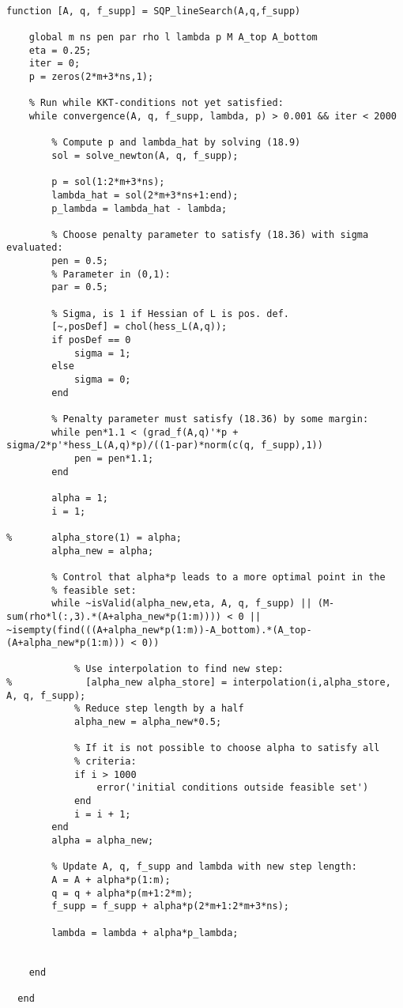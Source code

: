 \begin{lstlisting}

function [A, q, f_supp] = SQP_lineSearch(A,q,f_supp)
  
    global m ns pen par rho l lambda p M A_top A_bottom
    eta = 0.25;
    iter = 0;
    p = zeros(2*m+3*ns,1);

    % Run while KKT-conditions not yet satisfied:
    while convergence(A, q, f_supp, lambda, p) > 0.001 && iter < 2000 
        
        % Compute p and lambda_hat by solving (18.9)
        sol = solve_newton(A, q, f_supp);
        
        p = sol(1:2*m+3*ns);
        lambda_hat = sol(2*m+3*ns+1:end);
        p_lambda = lambda_hat - lambda;
        
        % Choose penalty parameter to satisfy (18.36) with sigma evaluated:
        pen = 0.5;
        % Parameter in (0,1):
        par = 0.5;

        % Sigma, is 1 if Hessian of L is pos. def.
        [~,posDef] = chol(hess_L(A,q));
        if posDef == 0
            sigma = 1;
        else
            sigma = 0;
        end

        % Penalty parameter must satisfy (18.36) by some margin:
        while pen*1.1 < (grad_f(A,q)'*p + sigma/2*p'*hess_L(A,q)*p)/((1-par)*norm(c(q, f_supp),1))
            pen = pen*1.1;
        end

        alpha = 1;
        i = 1;
            
%       alpha_store(1) = alpha;
        alpha_new = alpha;
        
        % Control that alpha*p leads to a more optimal point in the
        % feasible set:
        while ~isValid(alpha_new,eta, A, q, f_supp) || (M-sum(rho*l(:,3).*(A+alpha_new*p(1:m)))) < 0 || ~isempty(find(((A+alpha_new*p(1:m))-A_bottom).*(A_top-(A+alpha_new*p(1:m))) < 0))

            % Use interpolation to find new step:
%             [alpha_new alpha_store] = interpolation(i,alpha_store, A, q, f_supp); 
            % Reduce step length by a half
            alpha_new = alpha_new*0.5;
            
            % If it is not possible to choose alpha to satisfy all
            % criteria:
            if i > 1000
                error('initial conditions outside feasible set')
            end
            i = i + 1;
        end
        alpha = alpha_new;

        % Update A, q, f_supp and lambda with new step length:
        A = A + alpha*p(1:m);
        q = q + alpha*p(m+1:2*m);
        f_supp = f_supp + alpha*p(2*m+1:2*m+3*ns);

        lambda = lambda + alpha*p_lambda;
            
            
    end
    
  end
  
  \end{lstlisting}
